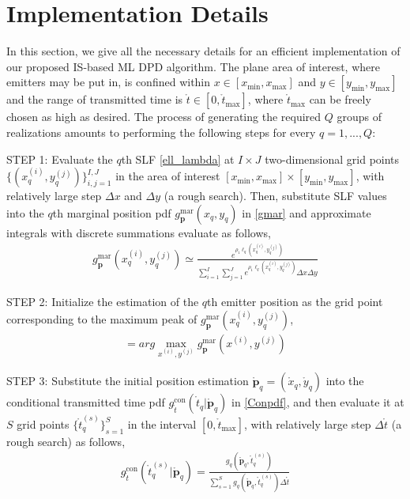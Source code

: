 \documentclass[review]{elsarticle}
\begin{document}
\section{Implementation Details}
In this section, we give all the necessary details for an efficient implementation of our proposed IS-based ML DPD algorithm. The plane area of interest, where emitters may be put in, is confined within $x\in [x_{\text{min}},x_{\text{max}}]$ and $y\in [y_{\text{min}},y_{\text{max}}]$ and the range of transmitted time is $\mathring{t}\in [0,\mathring{t}_{\text{max}}]$, where $\mathring{t}_{\text{max}}$ can be freely chosen as high as desired. The process of generating the required $Q$ groups of realizations amounts to performing the following steps for every $q=1,...,Q$: 

STEP 1: Evaluate the $q$th SLF \eqref{ell_lambda} at $I\times J$ two-dimensional grid points $\lbrace(x_q^{(i)},y_q^{(j)})\rbrace_{i,j=1}^{I,J}$ in the area of interest $[x_{\text{min}},x_{\text{max}}]\times [y_{\text{min}},y_{\text{max}}]$, with relatively large step $\Delta x$ and $\Delta y$ (a rough search). Then, substitute SLF values into the $q$th marginal position pdf $g_{\boldsymbol{p}}^{\text{mar}}(x_q,y_q)$ in \eqref{gmar} and approximate integrals with discrete summations evaluate as follows, 
\begin{align}\label{step1}
    g_{\boldsymbol{p}}^{\text{mar}}(x_q^{(i)},y_q^{(j)})\simeq\frac{e^{\rho_1\ell_q (x_q^{(i)},y_q^{(j)})}}{\sum_{i=1}^I\sum_{j=1}^J e^{\rho_1\ell_q (x_q^{(i)},y_q^{(j)})}\Delta x\Delta y}
\end{align}

STEP 2: Initialize the estimation of the $q$th emitter position as the grid point corresponding to the maximum peak of $g_{\boldsymbol{p}}^{\text{mar}}(x_q^{(i)},y_q^{(j)})$,
\begin{align}
    [\mathring{x}_q,\mathring{y}_q]=arg \max_{x^{(i)},y^{(j)}} g_{\boldsymbol{p}}^{\text{mar}}(x^{(i)},y^{(j)})
\end{align}

STEP 3: Substitute the initial position estimation $\mathring{\boldsymbol{p}}_q=(\mathring{x}_q,\mathring{y}_q)$ into the conditional transmitted time pdf $g_{\mathring{t}}^{\text{con}}(\mathring{t}_q\vert \mathring{\boldsymbol{p}}_q)$ in \eqref{Conpdf}, and then evaluate it at $S$ grid points $\lbrace \mathring{t}_q^{(s)} \rbrace_{s=1}^{S}$ in the interval $[0,\mathring{t}_{\text{max}}]$, with relatively large step $\Delta \mathring{t}$ (a rough search) as follows,
\begin{align}\label{step3}
    g_{\mathring{t}}^{\text{con}}(\mathring{t}_q^{(s)} \vert \mathring{\boldsymbol{p}}_q)=\frac{g_q(\mathring{\boldsymbol{p}}_q,\mathring{t}_q^{(s)})}{\sum_{s=1}^S g_q(\mathring{\boldsymbol{p}}_q,\mathring{t}_q^{(s)})\Delta\mathring{t}}
\end{align}
\end{document}
